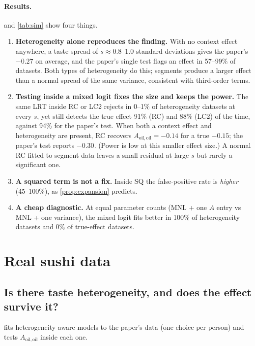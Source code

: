 \documentclass[11pt,a4paper]{article}
\theoremstyle{remark}
\newcommand{\Aoo}{A_{\mathrm{oil,oil}}}
\begin{document}
\paragraph{Results.}
 and \cref{tab:sim} show four things.
\begin{enumerate}
\item \textbf{Heterogeneity alone reproduces the finding.} With no context effect anywhere, a taste spread
      of $s\approx0.8$--$1.0$ standard deviations gives the paper's $-0.27$ on average, and the paper's single
      test flags an effect in 57--99\% of datasets. Both types of heterogeneity do this; segments produce a
      larger effect than a normal spread of the same variance, consistent with third-order terms.
\item \textbf{Testing inside a mixed logit fixes the size and keeps the power.} The same LRT inside RC or LC2
      rejects in 0--1\% of heterogeneity datasets at every $s$, yet still detects the true effect 91\% (RC)
      and 88\% (LC2) of the time, against 94\% for the paper's test. When both a context effect and
      heterogeneity are present, RC recovers $\Aoo=-0.14$ for a true $-0.15$; the paper's test reports
      $-0.30$. (Power is low at this smaller effect size.) A normal RC fitted to segment data leaves a small
      residual at large $s$ but rarely a significant one.
\item \textbf{A squared term is not a fix.} Inside SQ the false-positive rate is \emph{higher} (45--100\%),
      as \cref{prop:expansion} predicts.
\item \textbf{A cheap diagnostic.} At equal parameter counts (MNL + one $A$ entry vs MNL + one variance), the
      mixed logit fits better in 100\% of heterogeneity datasets and 0\% of true-effect datasets.
\end{enumerate}

\section{Real sushi data}
\label{sec:real}

\subsection{Is there taste heterogeneity, and does the effect survive it?}

 fits heterogeneity-aware models to the paper's data (one choice per person) and tests
$\Aoo$ inside each one.
\end{document}

